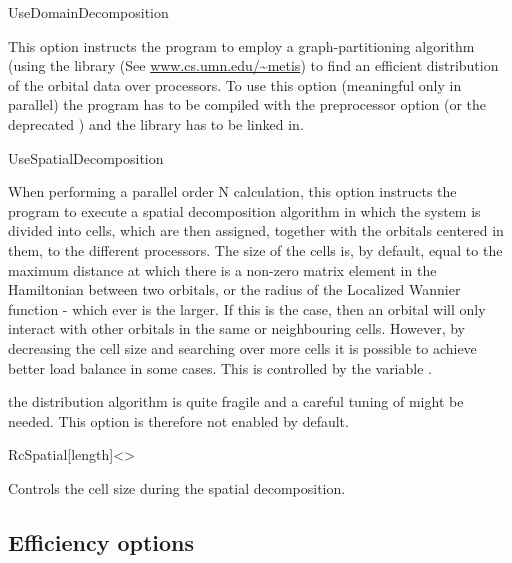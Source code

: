 \begin{fdflogicalF}{UseDomainDecomposition}
  
  This option instructs the program to employ a graph-partitioning
  algorithm (using the  library (See
  \url{www.cs.umn.edu/~metis}) to find an efficient distribution of
  the orbital data over processors.  To use this option (meaningful
  only in parallel) the program has to be compiled with the
  preprocessor option  (or the deprecated
  ) and the  library has to
  be linked in.

\end{fdflogicalF}

\begin{fdflogicalF}{UseSpatialDecomposition}

  When performing a parallel order N calculation, this option
  instructs the program to execute a spatial decomposition algorithm
  in which the system is divided into cells, which are then assigned,
  together with the orbitals centered in them, to the different
  processors. The size of the cells is, by default, equal to the
  maximum distance at which there is a non-zero matrix element in the
  Hamiltonian between two orbitals, or the radius of the Localized
  Wannier function - which ever is the larger. If this is the case,
  then an orbital will only interact with other orbitals in the same
  or neighbouring cells. However, by decreasing the cell size and
  searching over more cells it is possible to achieve better load
  balance in some cases. This is controlled by the variable
  .

  \note the distribution algorithm is quite fragile and a careful
  tuning of  might be needed. This option is therefore
  not enabled by default.

\end{fdflogicalF}

\begin{fdfentry}{RcSpatial}[length]<>
  
  Controls the cell size during the spatial decomposition.

\end{fdfentry}


\subsection{Efficiency options}

